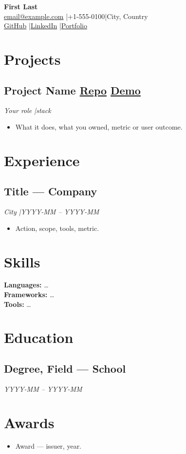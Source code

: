 \documentclass[10pt,letterpaper]{article}
\makeatletter
\newcommand{\Name}{First Last}
\newcommand{\Email}{email@example.com}
\newcommand{\Phone}{+1-555-0100}
\newcommand{\Location}{City, Country}
\newcommand{\LinkedIn}{https://linkedin.com/in/username}
\newcommand{\GitHub}{https://github.com/username}
\newcommand{\Portfolio}{https://example.com}
\makeatother
\begin{document}
\begin{center}
  {\LARGE\bfseries \Name}\\[0.3em]
  \href{mailto:\Email}{\Email} \quad|\quad \Phone \quad|\quad \Location\\[0.15em]
  \href{\GitHub}{GitHub} \quad|\quad \href{\LinkedIn}{LinkedIn} \quad|\quad \href{\Portfolio}{Portfolio}
\end{center}

\section{Projects}
\subsection{Project Name \quad \href{https://github.com/org/repo}{Repo} \quad \href{https://demo.example}{Demo}}
\textit{Your role \quad|\quad stack}
\begin{itemize}
  \item What it does, what you owned, metric or user outcome.
\end{itemize}

\section{Experience}
\subsection{Title --- Company}
\textit{City \quad|\quad YYYY-MM -- YYYY-MM}
\begin{itemize}
  \item Action, scope, tools, metric.
\end{itemize}

\section{Skills}
\textbf{Languages:} \ldots\\
\textbf{Frameworks:} \ldots\\
\textbf{Tools:} \ldots

\section{Education}
\subsection{Degree, Field --- School}
\textit{YYYY-MM -- YYYY-MM}

\section{Awards}
\begin{itemize}
  \item Award --- issuer, year.
\end{itemize}
\end{document}
